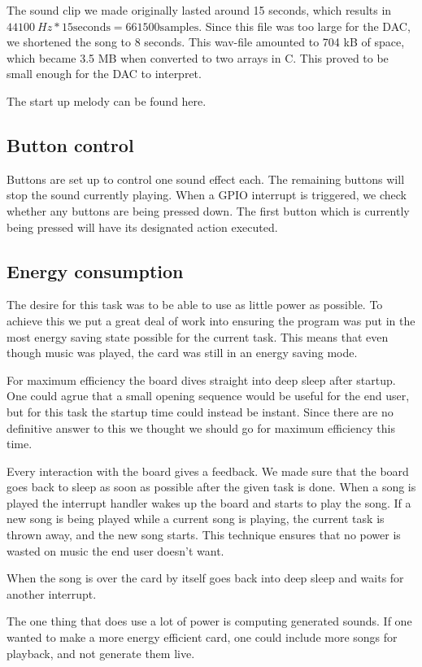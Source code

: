 The sound clip we made originally lasted around 15 seconds, which results in $\SI{44100}{Hz} * 15 \text{seconds} = 661500 \text{samples}$.
Since this file was too large for the DAC, we shortened the song to 8 seconds.
This wav-file amounted to 704 kB of space, which became 3.5 MB when converted to two arrays in C. This proved to be small enough for the DAC to interpret.

The start up melody can be found here. \cite{song}

\subsection{Button control}

Buttons are set up to control one sound effect each. The remaining buttons will stop the sound currently playing.
When a GPIO interrupt is triggered, we check whether any buttons are being pressed down.
The first button which is currently being pressed will have its designated action executed.

\subsection{Energy consumption}

The desire for this task was to be able to use as little power as possible.
To achieve this we put a great deal of work into ensuring the program was put in the most energy saving state possible for the current task.
This means that even though music was played, the card was still in an energy saving mode.

For maximum efficiency the board dives straight into deep sleep after startup.
One could agrue that a small opening sequence would be useful for the end user, but for this task the startup time could instead be instant.
Since there are no definitive answer to this we thought we should go for maximum efficiency this time.

Every interaction with the board gives a feedback.
We made sure that the board goes back to sleep as soon as possible after the given task is done.
When a song is played the interrupt handler wakes up the board and starts to play the song.
If a new song is being played while a current song is playing, the current task is thrown away, and the new song starts.
This technique ensures that no power is wasted on music the end user doesn't want.

When the song is over the card by itself goes back into deep sleep and waits for another interrupt.

The one thing that does use a lot of power is computing generated sounds.
If one wanted to make a more energy efficient card, one could include more songs for playback, and not generate them live.
